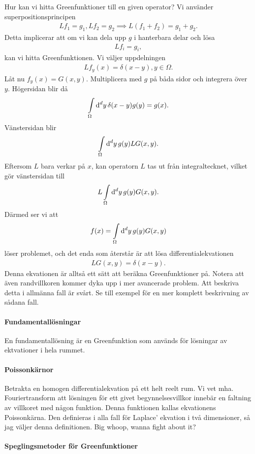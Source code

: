 Hur kan vi hitta Greenfunktioner till en given operator? Vi använder superpositionsprincipen
\begin{align*}
	Lf_{1} = g_{1}, Lf_{2} = g_{2} \implies L(f_{1} + f_{2}) = g_{1} + g_{2}.
\end{align*}
Detta implicerar att om vi kan dela upp $g$ i hanterbara delar och lösa
\begin{align*}
	Lf_{i} = g_{i},
\end{align*}
kan vi hitta Greenfunktionen. Vi väljer uppdelningen
\begin{align*}
	Lf_{y}(x) = \delta(x - y), y\in\Omega.
\end{align*}
Låt nu $f_{y}(x) = G(x, y)$. Multiplicera med $g$ på båda sidor och integrera över $y$. Högersidan blir då
\begin{align*}
	\int\limits_{\Omega}\dd[d]{y}\delta(x - y)g(y) = g(x).
\end{align*}
Vänstersidan blir
\begin{align*}
	\int\limits_{\Omega}\dd[d]{y}g(y)LG(x, y).
\end{align*}
Eftersom $L$ bara verkar på $x$, kan operatorn $L$ tas ut från integraltecknet, vilket gör vänstersidan till
\begin{align*}
	L\int\limits_{\Omega}\dd[d]{y}g(y)G(x, y).
\end{align*}
Därmed ser vi att
\begin{align*}
	f(x) = \int\limits_{\Omega}\dd[d]{y}g(y)G(x, y)
\end{align*}
löser problemet, och det enda som återstår är att lösa differentialekvationen
\begin{align*}
	LG(x, y) = \delta(x - y).
\end{align*}
Denna ekvationen är alltså ett sätt att beräkna Greenfunktioner på. Notera att även randvillkoren kommer dyka upp i mer avancerade problem. Att beskriva detta i allmänna fall är svårt. Se till exempel för en mer komplett beskrivning av sådana fall.

\paragraph{Fundamentallösningar}
En fundamentallösning är en Greenfunktion som används för lösningar av ektvationer i hela rummet.

\paragraph{Poissonkärnor}
Betrakta en homogen differentialekvation på ett helt reelt rum. Vi vet mha. Fouriertransform att lösningen för ett givet begynnelsesvillkor innebär en faltning av villkoret med någon funktion. Denna funktionen kallas ekvationens Poissonkärna. Den definieras i alla fall för Laplace' ekvation i två dimensioner, så jag väljer denna definitionen. Big whoop, wanna fight about it?

\paragraph{Speglingsmetoder för Greenfunktioner}